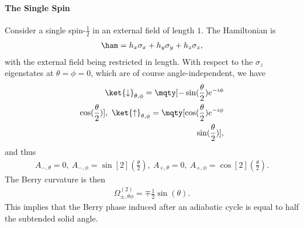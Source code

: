 \paragraph{The Single Spin}
Consider a single spin-$\frac{1}{2}$ in an external field of length $1$. The Hamiltonian is
\begin{align*}
	\ham = h_{x}\sigma_{x} + h_{y}\sigma_{y} + h_{z}\sigma_{z},
\end{align*}
with the external field being restricted in length. With respect to the $\sigma_{z}$ eigenstates at $\theta = \phi = 0$, which are of course angle-independent, we have
\begin{align}
	\ket{\downarrow}_{\theta, \phi} = \mqty[
		-\sin(\frac{\theta}{2})e^{-i\phi} \\
		\cos(\frac{\theta}{2})
	],\ \ket{\uparrow}_{\theta, \phi} = \mqty[
		\cos(\frac{\theta}{2})e^{-i\phi} \\
		\sin(\frac{\theta}{2})
	],
	\label{eq:spin_angle_states}
\end{align}
and thus
\begin{align*}
	A_{-, \theta} = 0,\ A_{-, \phi} = \sin[2](\frac{\theta}{2}),\ A_{+, \theta} = 0,\ A_{+, \phi} = \cos[2](\frac{\theta}{2}).
\end{align*}
The Berry curvature is then
\begin{align*}
	\Omega^{(2)}_{\pm, \theta\phi} = \mp\frac{1}{2}\sin(\theta).
\end{align*}
This implies that the Berry phase induced after an adiabatic cycle is equal to half the subtended solid angle.

